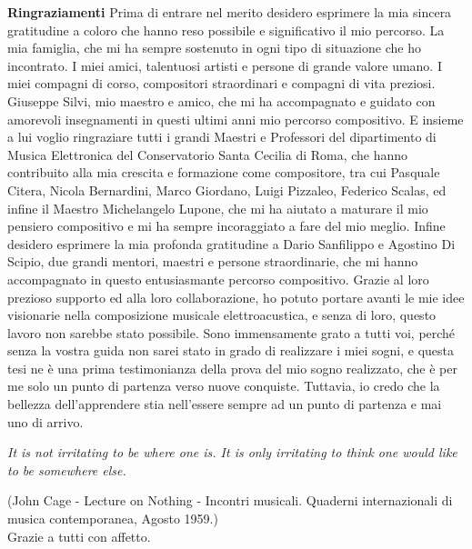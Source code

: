 \vfill
\LARGE \textbf{Ringraziamenti} \normalsize \newline \newline
Prima di entrare nel merito desidero esprimere la mia sincera gratitudine 
a coloro che hanno reso possibile e significativo il mio percorso.
La mia famiglia, che mi ha sempre sostenuto in ogni tipo di situazione che ho incontrato.
I miei amici, talentuosi artisti e persone di grande valore umano.
I miei compagni di corso, compositori straordinari e compagni di vita preziosi.
Giuseppe Silvi, mio maestro e amico, che mi ha accompagnato e guidato con amorevoli insegnamenti 
in questi ultimi anni mio percorso compositivo.
E insieme a lui voglio ringraziare tutti i grandi Maestri e Professori del dipartimento di 
Musica Elettronica del Conservatorio Santa Cecilia di Roma, 
che hanno contribuito alla mia crescita e formazione come compositore, 
tra cui Pasquale Citera, Nicola Bernardini, Marco Giordano, Luigi Pizzaleo, 
Federico Scalas, ed infine il Maestro Michelangelo Lupone, 
che mi ha aiutato a maturare il mio pensiero compositivo e 
mi ha sempre incoraggiato a fare del mio meglio.
Infine desidero esprimere la mia profonda gratitudine a Dario Sanfilippo e Agostino Di Scipio, 
due grandi mentori, maestri e persone straordinarie, 
che mi hanno accompagnato in questo entusiasmante percorso compositivo. 
Grazie al loro prezioso supporto ed alla loro collaborazione, 
ho potuto portare avanti le mie idee visionarie nella composizione musicale elettroacustica,
e senza di loro, questo lavoro non sarebbe stato possibile. 
Sono immensamente grato a tutti voi, 
perché senza la vostra guida non sarei stato in grado di realizzare i miei sogni, 
e questa tesi ne è una prima testimonianza della prova del mio sogno realizzato, 
che è per me solo un punto di partenza verso nuove conquiste.
Tuttavia, io credo che la bellezza dell'apprendere stia nell'essere sempre 
ad un punto di partenza e mai uno di arrivo. 
\begin{center} \textit{
It is not irritating to be where one is. 
It is only irritating to think one would like to be somewhere else.} \\
\end{center}
(John Cage - Lecture on Nothing - Incontri musicali. 
Quaderni internazionali di musica contemporanea, Agosto 1959.) \\
Grazie a tutti con affetto.